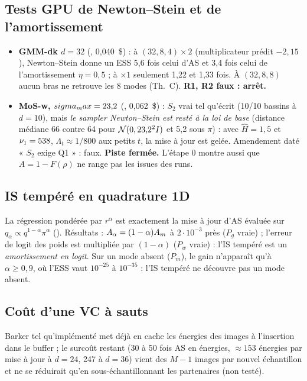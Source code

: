 \subsection{Tests GPU de Newton--Stein et de l'amortissement}
\begin{itemize}
  \item \textbf{GMM-dk $d=32$} (, 0,040~\$) : à $(32,8,4)\times2$ (multiplicateur prédit $-2{,}15$), Newton--Stein donne un ESS 5,6 fois celui d'AS et 3,4 fois celui de l'amortissement $\eta=0{,}5$ ; à $\times1$ seulement 1,22 et 1,33 fois. À $(32,8,8)$ aucun bras ne retrouve les 8 modes (Th.~C). \textbf{R1, R2 faux : arrêt.}
  \item \textbf{MoS-w, $sigma_max=23{,}2$} (, 0,062~\$) : $S_2$ vrai tel qu'écrit (10/10 bassins à $d=10$), mais \emph{le sampler Newton--Stein est resté à la loi de base} (distance médiane 66 contre 64 pour $\mathcal{N}(0,23{,}2^2I)$ et 5,2 sous $\pi$) : avec $\hat H=1{,}5$ et $\nu_{1}=538$, $\Lambda_t\approx1/800$ aux petits $t$, la mise à jour est gelée. Amendement daté « $S_2$ exige Q1 » : faux. \textbf{Piste fermée.} L'étape 0 montre aussi que $A=1-F(\rho)$ ne range pas les issues des runs.
\end{itemize}

\subsection{IS tempéré en quadrature 1D}
La régression pondérée par $r^\alpha$ est exactement la mise à jour d'AS évaluée sur $q_\alpha\propto q^{1-\alpha}\pi^\alpha$ (). Résultats : $A_\alpha=(1-\alpha)A_m$ à $2\cdot10^{-3}$ près ($P_g$ vraie) ; l'erreur de logit des poids est multipliée par $(1-\alpha)$ ($P_w$ vraie) : l'IS tempéré est un \emph{amortissement en logit}. Sur un mode absent ($P_m$), le gain n'apparaît qu'à $\alpha\ge0{,}9$, où l'ESS vaut $10^{-25}$ à $10^{-35}$ : l'IS tempéré ne découvre pas un mode absent.

\subsection{Coût d'une VC à sauts}
Barker tel qu'implémenté met déjà en cache les énergies des images à l'insertion dans le buffer ; le surcoût restant (30 à 50 fois AS en énergies, $\approx153$ énergies par mise à jour à $d=24$, 247 à $d=36$) vient des $M-1$ images par nouvel échantillon et ne se réduirait qu'en sous-échantillonnant les partenaires (non testé).
